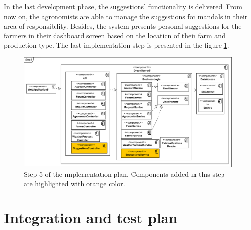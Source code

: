 In the last development phase, the suggestions' functionality is delivered. From now on, the agronomists are able to manage the suggestions for mandals in their area of responsibility. Besides, the system presents personal suggestions for the farmers in their dashboard screen based on the location of their farm and production type. The last implementation step is presented in the figure \ref{fig:step5}.

\begin{figure}[H]
    \centering
    \includegraphics[width=\textwidth]
    {diagrams/implementation-plan/Step5.png}
    \caption{Step 5 of the implementation plan. Components added in this step are highlighted with orange color.}
    \label{fig:step5}
\end{figure}

\section{Integration and test plan}